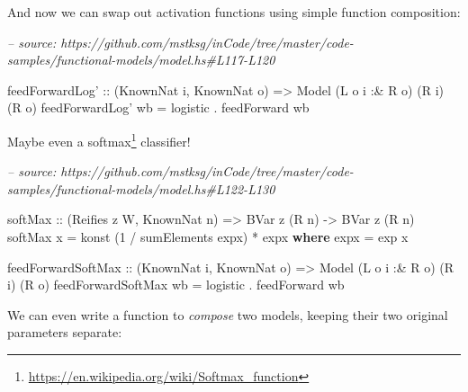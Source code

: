 \documentclass[]{article}
\newenvironment{Shaded}{}{}
\newcommand{\CommentTok}[1]{\textcolor[rgb]{0.38,0.63,0.69}{\textit{#1}}}
\newcommand{\DataTypeTok}[1]{\textcolor[rgb]{0.56,0.13,0.00}{#1}}
\newcommand{\DecValTok}[1]{\textcolor[rgb]{0.25,0.63,0.44}{#1}}
\newcommand{\FunctionTok}[1]{\textcolor[rgb]{0.02,0.16,0.49}{#1}}
\newcommand{\KeywordTok}[1]{\textcolor[rgb]{0.00,0.44,0.13}{\textbf{#1}}}
\newcommand{\NormalTok}[1]{#1}
\newcommand{\OtherTok}[1]{\textcolor[rgb]{0.00,0.44,0.13}{#1}}
\renewcommand{\href}[2]{#2\footnote{\url{#1}}}
\begin{document}
And now we can swap out activation functions using simple function composition:

\begin{Shaded}
\begin{Highlighting}[]
\CommentTok{-- source: https://github.com/mstksg/inCode/tree/master/code-samples/functional-models/model.hs#L117-L120}

\NormalTok{feedForwardLog'}
\OtherTok{    ::}\NormalTok{ (}\DataTypeTok{KnownNat}\NormalTok{ i, }\DataTypeTok{KnownNat}\NormalTok{ o)}
    \OtherTok{=>} \DataTypeTok{Model}\NormalTok{ (}\DataTypeTok{L}\NormalTok{ o i }\FunctionTok{:&} \DataTypeTok{R}\NormalTok{ o) (}\DataTypeTok{R}\NormalTok{ i) (}\DataTypeTok{R}\NormalTok{ o)}
\NormalTok{feedForwardLog' wb }\FunctionTok{=}\NormalTok{ logistic }\FunctionTok{.}\NormalTok{ feedForward wb}
\end{Highlighting}
\end{Shaded}

Maybe even a \href{https://en.wikipedia.org/wiki/Softmax_function}{softmax}
classifier!

\begin{Shaded}
\begin{Highlighting}[]
\CommentTok{-- source: https://github.com/mstksg/inCode/tree/master/code-samples/functional-models/model.hs#L122-L130}

\OtherTok{softMax ::}\NormalTok{ (}\DataTypeTok{Reifies}\NormalTok{ z }\DataTypeTok{W}\NormalTok{, }\DataTypeTok{KnownNat}\NormalTok{ n) }\OtherTok{=>} \DataTypeTok{BVar}\NormalTok{ z (}\DataTypeTok{R}\NormalTok{ n) }\OtherTok{->} \DataTypeTok{BVar}\NormalTok{ z (}\DataTypeTok{R}\NormalTok{ n)}
\NormalTok{softMax x }\FunctionTok{=}\NormalTok{ konst (}\DecValTok{1} \FunctionTok{/}\NormalTok{ sumElements expx) }\FunctionTok{*}\NormalTok{ expx}
  \KeywordTok{where}
\NormalTok{    expx }\FunctionTok{=}\NormalTok{ exp x}

\NormalTok{feedForwardSoftMax}
\OtherTok{    ::}\NormalTok{ (}\DataTypeTok{KnownNat}\NormalTok{ i, }\DataTypeTok{KnownNat}\NormalTok{ o)}
    \OtherTok{=>} \DataTypeTok{Model}\NormalTok{ (}\DataTypeTok{L}\NormalTok{ o i }\FunctionTok{:&} \DataTypeTok{R}\NormalTok{ o) (}\DataTypeTok{R}\NormalTok{ i) (}\DataTypeTok{R}\NormalTok{ o)}
\NormalTok{feedForwardSoftMax wb }\FunctionTok{=}\NormalTok{ logistic }\FunctionTok{.}\NormalTok{ feedForward wb}
\end{Highlighting}
\end{Shaded}

We can even write a function to \emph{compose} two models, keeping their two
original parameters separate:
\end{document}
